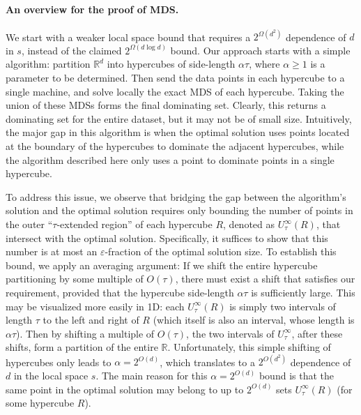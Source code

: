 \documentclass[11pt,letterpaper]{article}
\theoremstyle{plain}
\theoremstyle{definition}
\theoremstyle{remark}
\begin{document}
\paragraph{An overview for the proof of MDS.}
We start with a weaker local space bound that requires a $2^{\Omega(d^2)}$ dependence of $d$ in $s$,
instead of the claimed $2^{\Omega(d \log d)}$ bound.
Our approach starts with a simple algorithm:
partition $\mathbb{R}^d$ into hypercubes of side-length $\alpha \tau$, where $\alpha \geq 1$ is a parameter to be determined. Then send the data points in each hypercube to a single machine, and solve locally the exact MDS of each hypercube.
Taking the union of these MDSs forms the final dominating set. Clearly, this returns a dominating set for the entire dataset,
but it may not be of small size.
Intuitively, the major gap in this algorithm is when the optimal solution uses points located at the boundary of the hypercubes to dominate the adjacent hypercubes,
while the algorithm described here only uses a point to dominate points in a single hypercube.

To address this issue, we observe that bridging the gap between the algorithm's solution and the optimal solution requires only bounding the number of points in the outer ``$\tau$-extended region'' of each hypercube $R$, denoted as $U_{\tau}^{\infty}(R)$, that intersect with the optimal solution.
Specifically, it suffices to show that this number is at most an $\varepsilon$-fraction of the optimal solution size.
To establish this bound, we apply an averaging argument:
If we shift the entire hypercube partitioning by some multiple of $O(\tau)$, there must exist a shift that satisfies our requirement, provided that the hypercube side-length $\alpha\tau$ is sufficiently large.
This may be visualized more easily in 1D:
each $U_{\tau}^{\infty}(R)$ is simply two intervals of length $\tau$ to the left and right of $R$ (which itself is also an interval, whose length is $\alpha \tau$).
Then by shifting a multiple of $O(\tau)$, the two intervals of $U_\tau^{\infty}$,
 after these shifts,
form a partition of the entire $\mathbb{R}$.
Unfortunately, this simple shifting of hypercubes only leads to $\alpha = 2^{O(d)}$,
which translates to a $2^{O(d^2)}$ dependence of $d$ in the local space $s$.
The main reason for this $\alpha = 2^{O(d)}$ bound is that the same point in the optimal solution may belong to up to $2^{O(d)}$ sets $U_\tau^{\infty}(R)$ (for some hypercube $R$).
\end{document}
